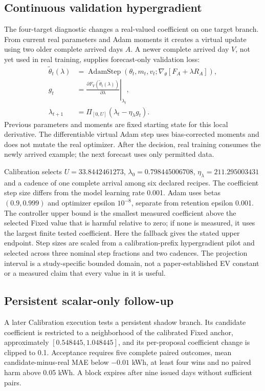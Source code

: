 \documentclass[pdflatex,iicol,sn-mathphys-num]{sn-jnl}
\begin{document}
\subsection{Continuous validation hypergradient}
The four-target diagnostic changes a real-valued coefficient on one target branch. From current real parameters and Adam moments it creates a virtual update using two older complete arrived days $A$. A newer complete arrived day $V$, not yet used in real training, supplies forecast-only validation loss:
\begin{equation}\begin{aligned}
\widetilde\theta_t(\lambda)&=\operatorname{AdamStep}
\left(\theta_t,m_t,v_t;\nabla_\theta[F_A+\lambda R_A]\right),\\
g_t&=\left.\frac{\partial F_V(\widetilde\theta_t(\lambda))}
{\partial\lambda}\right|_{\lambda_t},\\
\lambda_{t+1}&=\Pi_{[0,U]}\left(\lambda_t-\eta_\lambda g_t\right).
\end{aligned}\label{eq:hypergradient}\end{equation}
Previous parameters and moments are fixed starting state for this local derivative. The differentiable virtual Adam step uses bias-corrected moments and does not mutate the real optimizer. After the decision, real training consumes the newly arrived example; the next forecast uses only permitted data.

Calibration selects $U=33.8442461273$, $\lambda_0=0.798445006708$, $\eta_\lambda=211.295003431$ and a cadence of one complete arrival among six declared recipes. The coefficient step size differs from the model learning rate 0.001. Adam uses betas $(0.9,0.999)$ and optimizer epsilon $10^{-8}$, separate from retention epsilon 0.001. The controller upper bound is the smallest measured coefficient above the selected Fixed value that is harmful relative to zero; if none is measured, it uses the largest finite tested coefficient. Here the fallback gives the stated upper endpoint. Step sizes are scaled from a calibration-prefix hypergradient pilot and selected across three nominal step fractions and two cadences. The projection interval is a study-specific bounded domain, not a paper-established EV constant or a measured claim that every value in it is useful.

\subsection{Persistent scalar-only follow-up}
A later Calibration execution tests a persistent shadow branch. Its candidate coefficient is restricted to a neighborhood of the calibrated Fixed anchor, approximately $[0.548445,1.048445]$, and its per-proposal coefficient change is clipped to 0.1. Acceptance requires five complete paired outcomes, mean candidate-minus-real MAE below $-0.01$ kWh, at least four wins and no paired harm above 0.05 kWh. A block expires after nine issued days without sufficient pairs.
\end{document}
